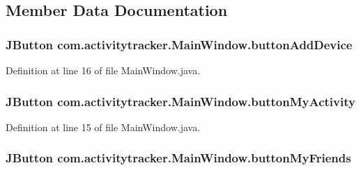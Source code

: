 \subsection{Member Data Documentation}
\subsubsection[{\texorpdfstring{button\+Add\+Device}{buttonAddDevice}}]{\setlength{\rightskip}{0pt plus 5cm}J\+Button com.\+activitytracker.\+Main\+Window.\+button\+Add\+Device\hspace{0.3cm}{\ttfamily [private]}}\hypertarget{classcom_1_1activitytracker_1_1_main_window_af241d0ee8023ed099caa204419d74ccb}{}\label{classcom_1_1activitytracker_1_1_main_window_af241d0ee8023ed099caa204419d74ccb}


Definition at line 16 of file Main\+Window.\+java.

\subsubsection[{\texorpdfstring{button\+My\+Activity}{buttonMyActivity}}]{\setlength{\rightskip}{0pt plus 5cm}J\+Button com.\+activitytracker.\+Main\+Window.\+button\+My\+Activity\hspace{0.3cm}{\ttfamily [private]}}\hypertarget{classcom_1_1activitytracker_1_1_main_window_adec15801f8e16f769bd954e351a663fa}{}\label{classcom_1_1activitytracker_1_1_main_window_adec15801f8e16f769bd954e351a663fa}


Definition at line 15 of file Main\+Window.\+java.

\subsubsection[{\texorpdfstring{button\+My\+Friends}{buttonMyFriends}}]{\setlength{\rightskip}{0pt plus 5cm}J\+Button com.\+activitytracker.\+Main\+Window.\+button\+My\+Friends\hspace{0.3cm}{\ttfamily [private]}}\hypertarget{classcom_1_1activitytracker_1_1_main_window_a4d9543db1723fd7d1921f07cc92e2abb}{}\label{classcom_1_1activitytracker_1_1_main_window_a4d9543db1723fd7d1921f07cc92e2abb}


